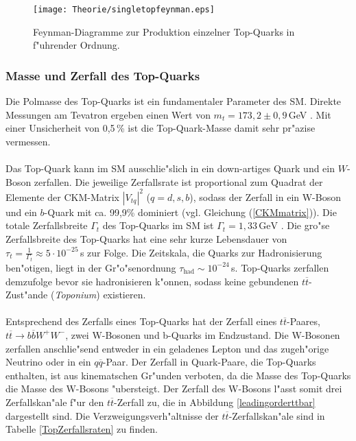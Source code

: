 \begin{figure}[ht]
	\centering
	\texttt{[image: Theorie/singletopfeynman.eps]}
	\caption[Feynman-Diagramme zur Produktion einzelner Top-Quarks in f"uhrender Ordnung]{Feynman-Diagramme zur Produktion einzelner Top-Quarks in f"uhrender Ordnung.}
	\label{singletopprod}
\end{figure}




\subsubsection{Masse und Zerfall des Top-Quarks}
\label{massanddecaytop}
Die Polmasse des Top-Quarks ist ein fundamentaler Parameter des SM. Direkte Messungen am Tevatron ergeben einen Wert von $m_{t}=173,2\pm 0,9$\,GeV \cite{Lancaster:2011wr}. Mit einer Unsicherheit von 0,5\,\% ist die Top-Quark-Masse damit sehr pr"azise vermessen.
\\
\\
Das Top-Quark kann im SM ausschlie"slich in ein down-artiges Quark und ein $W$-Boson zerfallen. Die jeweilige Zerfallsrate ist proportional zum Quadrat der Elemente der CKM-Matrix $|V_{tq}|^{2}$ ($q=d,s,b$), sodass der Zerfall in ein W-Boson und ein $b$-Quark mit ca. 99,9\% dominiert (vgl. Gleichung (\ref{CKMmatrix})). Die totale Zerfallsbreite $\Gamma_{t}$ des Top-Quarks im SM ist $\Gamma_{t}=1,33\,\text{GeV} $ \cite{Jezabek:1988iv}. Die gro"se Zerfallsbreite des Top-Quarks hat eine sehr kurze Lebensdauer von $\tau_{t}=\frac{1}{\Gamma_{t}}\approx 5\cdot 10^{-25}$\,s zur Folge. Die Zeitskala, die Quarks zur Hadronisierung ben"otigen, liegt in der Gr"o"senordnung $\tau_{\text{had}}\sim 10^{-24}$\,s. Top-Quarks zerfallen demzufolge bevor sie hadronisieren k"onnen, sodass keine gebundenen $t\overline{t}$-Zust"ande (\textit{Toponium}) existieren.\\
\\
Entsprechend des Zerfalls eines Top-Quarks hat der Zerfall eines $t\overline{t}$-Paares, $t\overline{t}\rightarrow b\overline{b}W^{+}W^{-}$, zwei W-Bosonen und b-Quarks im Endzustand. Die W-Bosonen zerfallen anschlie"send entweder in ein geladenes Lepton und das zugeh"orige Neutrino oder in ein $q\overline{q}$-Paar. Der Zerfall in Quark-Paare, die Top-Quarks enthalten, ist aus kinematschen Gr"unden verboten, da die Masse des Top-Quarks die Masse des W-Bosons "ubersteigt. Der Zerfall des W-Bosons l"asst somit drei Zerfallskan"ale f"ur den $t\overline{t}$-Zerfall zu, die in Abbildung \ref{leadingorderttbar} dargestellt sind. Die Verzweigungsverh"altnisse der $t\overline{t}$-Zerfallskan"ale sind in Tabelle \ref{TopZerfallsraten} zu finden.  \\

